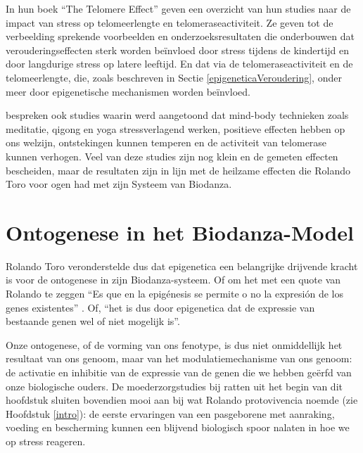 \documentclass[
  11pt,
]{book}
\begin{document}
In hun boek ``The Telomere Effect'' geven \citet{BlackburnEpel2017} een overzicht van hun studies naar de impact van stress op telomeerlengte en telomeraseactiviteit. Ze geven tot de verbeelding sprekende voorbeelden en onderzoeksresultaten die onderbouwen dat verouderingseffecten sterk worden beïnvloed door stress tijdens de kindertijd en door langdurige stress op latere leeftijd. En dat via de telomeraseactiviteit en de telomeerlengte, die, zoals beschreven in Sectie \ref{epigeneticaVeroudering}, onder meer door epigenetische mechanismen worden beïnvloed.

\citet{BlackburnEpel2017} bespreken ook studies waarin werd aangetoond dat mind-body technieken zoals meditatie, qigong en yoga stressverlagend werken, positieve effecten hebben op ons welzijn, ontstekingen kunnen temperen en de activiteit van telomerase kunnen verhogen. Veel van deze studies zijn nog klein en de gemeten effecten bescheiden, maar de resultaten zijn in lijn met de heilzame effecten die Rolando Toro voor ogen had met zijn Systeem van Biodanza.

\section{Ontogenese in het Biodanza-Model}\label{ontogenese-in-het-biodanza-model}

Rolando Toro veronderstelde dus dat epigenetica een belangrijke drijvende kracht is voor de ontogenese in zijn Biodanza-systeem.
Of om het met een quote van Rolando te zeggen ``Es que en la epigénesis
se permite o no la expresión de los genes existentes'' \citep{Montanari2023}. Of, ``het is dus door epigenetica dat de expressie van bestaande genen wel of niet mogelijk is''.

Onze ontogenese, of de vorming van ons fenotype, is dus niet onmiddellijk het resultaat van ons genoom, maar van het modulatiemechanisme van ons genoom: de activatie en inhibitie van de expressie van de genen die we hebben geërfd van onze biologische ouders. De moederzorgstudies bij ratten uit het begin van dit hoofdstuk sluiten bovendien mooi aan bij wat Rolando protovivencia noemde (zie Hoofdstuk \ref{intro}): de eerste ervaringen van een pasgeborene met aanraking, voeding en bescherming kunnen een blijvend biologisch spoor nalaten in hoe we op stress reageren.
\end{document}
